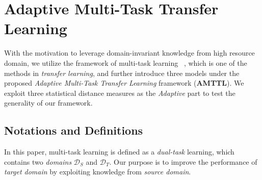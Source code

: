 \section{Adaptive Multi-Task Transfer Learning}\label{sec:multi-cws}



With the motivation to leverage domain-invariant knowledge from high resource domain, we utilize the framework of multi-task learning ~\cite{Caruana1997}, which is one of the methods in \textit{transfer learning}, and further introduce three models under the proposed \textit{Adaptive Multi-Task Transfer Learning} framework (\textbf{AMTTL}). We exploit three statistical distance measures as the 
\textit{Adaptive} part to test the generality of our framework.

\subsection{Notations and Definitions}


In this paper, multi-task learning is defined as a \textit{dual-task} learning, which contains two \textit{domains} $\mathcal{D}_S$ and $\mathcal{D}_T$. Our purpose is to improve the performance of \textit{target domain} by exploiting knowledge from \textit{source domain}. 

